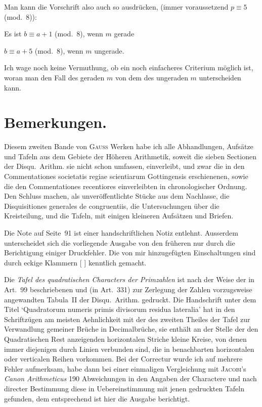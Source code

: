 \documentclass[10pt,a4paper]{article}
\begin{document}
Man kann die Vorschrift also auch so ausdr\"ucken, (immer voraussetzend $p \equiv 5$ (mod.~8)):

Es ist $b \equiv a+1$ (mod.~8), wenn $m$ gerade

$b \equiv a+5$ (mod.~8), wenn $m$ ungerade.

Ich wage noch keine Vermuthung, ob ein noch einfacheres Criterium m\"oglich ist, woran man den Fall des geraden $m$ von dem des ungeraden $m$ unterscheiden kann.

\newpage

\section{Bemerkungen.}

Diesem zweiten Bande von \textsc{Gau\ss} Werken habe ich alle Abhandlungen, Aufs\"atze und Tafeln aus dem Gebiete der H\"oheren Arithmetik, soweit die sieben Sectionen der Disqu.~Arithm. sie nicht schon umfassen, einverleibt, und zwar die in den Commentationes societatis regiae scientiarum Gottingensis erschienenen, sowie die den Commentationes recentiores einverleibten in chronologischer Ordnung. Den Schluss machen, als unver\"offentlichte St\"ucke aus dem Nachlasse, die Disquisitiones generales de congruentiis, die Untersuchungen \"uber die Kreisteilung, und die Tafeln, mit einigen kleineren Aufs\"atzen und Briefen.

Die Note auf Seite~91 ist einer handschriftlichen Notiz entlehnt. Ausserdem unterscheidet sich die vorliegende Ausgabe von den fr\"uheren nur durch die Berichtigung einiger Druckfehler. Die von mir hinzugef\"ugten Einschaltungen sind durch eckige Klammern [ ] kenntlich gemacht.

\medskip

Die \textit{Tafel des quadratischen Characters der Primzahlen} ist nach der Weise der in Art.~99 beschriebenen und (in Art.~331) zur Zerlegung der Zahlen vorzugsweise angewandten Tabula~II der Disqu.~Arithm. gedruckt. Die Handschrift unter dem Titel `Quadratorum numeris primis divisorum residua lateralia' hat in den Schriftz\"ugen am meisten Aehnlichkeit mit der des zweiten Theiles der Tafel zur Verwandlung gemeiner Br\"uche in Decimalbr\"uche, sie enth\"alt an der Stelle der den Quadratischen Rest anzeigenden horizontalen Striche kleine Kreise, von denen immer diejenigen durch Linien verbunden sind, die in benachbarten horizontalen oder verticalen Reihen vorkommen. Bei der Correctur wurde ich auf mehrere Fehler aufmerksam, habe dann bei einer einmaligen Vergleichung mit \textsc{Jacobi}'s \textit{Canon Arithmeticus} 190 Abweichungen in den Angaben der Charactere und nach directer Bestimmung diese in Uebereinstimmung mit jenen gedruckten Tafeln gefunden, dem entsprechend ist hier die Ausgabe berichtigt.
\end{document}
